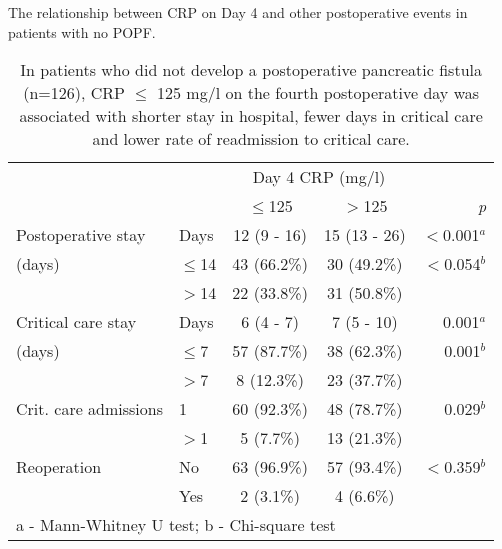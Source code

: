\begin{table}[p]
	\centering
	\caption{The relationship between CRP on Day 4 and other postoperative events in patients with no POPF.}
	\label{table:crp_comp_CRP4_vs_LOS}
	\renewcommand{\arraystretch}{1.4} %
	\setlength{\tabcolsep}{9pt} %
	\begin{tabular}{|l l  c c r |}
		\hline
		                      &          & \multicolumn{2}{c}{Day 4 CRP (mg/l)} &  \\
		                      &          & $\leq$125   & $>$125                   & \textit{p}   \\ \hline
		Postoperative stay    & Days     & 12 (9 - 16) & 15 (13 - 26)             & $<$0.001$^a$ \\
		(days)                & $\leq$14 & 43 (66.2\%) & 30 (49.2\%)              & $<$0.054$^b$ \\
		                      & $>$14    & 22 (33.8\%) & 31 (50.8\%)              &  \\
		Critical care stay    & Days     & 6 (4 - 7)   & 7 (5 - 10)               & 0.001$^a$    \\
		(days)                & $\leq$7  & 57 (87.7\%) & 38 (62.3\%)              & 0.001$^b$    \\
		                      & $>$7     & 8 (12.3\%)  & 23 (37.7\%)              &  \\
		Crit. care admissions & 1        & 60 (92.3\%) & 48 (78.7\%)              & 0.029$^b$    \\
		                      & $>$1     & 5 (7.7\%)   & 13 (21.3\%)              &  \\
		Reoperation           & No       & 63 (96.9\%) & 57 (93.4\%)              & $<$0.359$^b$ \\
		                      & Yes      & 2 (3.1\%)   & 4 (6.6\%)                &  \\ \hline
		\multicolumn{5}{l}{a - Mann-Whitney U test; b - Chi-square test}
	\end{tabular}
	\caption*{In patients who did not develop a postoperative pancreatic fistula (n=126), CRP $\leq$ 125 mg/l on the fourth postoperative day was associated with shorter stay in hospital, fewer days in critical care and lower rate of readmission to critical care.}
\end{table}




